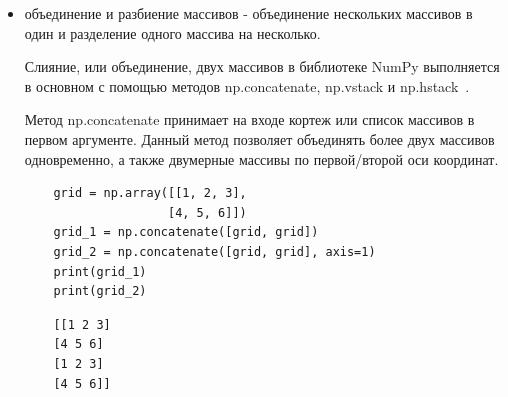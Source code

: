 \documentclass[pract]{SCWorks}
\begin{document}
\begin{itemize}
    [[1 2 3]

    [4 5 6]

    [7 8 9]]

    Операция изменения формы часто используется для преобразования одномерного массива в двумерную 
    матрицу-строку или матрицу-столбец.

        \begin{verbatim}
    x = np.array([1, 2, 3])
    # reshape возвращает новый объект, исходный x не меняется
    row = x.reshape((1, 3))   # вектор-строка
    col = x.reshape((3, 1))   # вектор-столбец
    print(row)
    print(col)
    \end{verbatim}
    В консоли:

    \begin{verbatim}
    [[1 2 3]]
    [[1]
     [2]
     [3]]
    \end{verbatim}

    Интересная "фишка" с коротким синтаксисом через метод \textbf{np.newaxis} с применением срезов для преобразования 
    одномерного массива в двумерную матрицу-строку или матрицу-столбец:

    \begin{verbatim}
    # преобразование в вектор-строку с помощью newaxis
    x[np.newaxis, :]
    # преобразование в вектор-столбец с помощью newaxis
    x[:, np.newaxis]
    \end{verbatim}
    \item объединение и разбиение массивов - объединение нескольких массивов в один и разделение одного массива на несколько.

    Слияние, или объединение, двух массивов в библиотеке NumPy выполняется в основном с помощью методов 
    np.concatenate, np.vstack и np.hstack~\cite{vanderplas}.

    Метод np.concatenate принимает на входе кортеж или список массивов в первом аргументе. Данный метод 
    позволяет объединять более двух массивов одновременно, а также двумерные массивы по первой/второй оси координат.

    \begin{verbatim}
    grid = np.array([[1, 2, 3],
                    [4, 5, 6]])
    grid_1 = np.concatenate([grid, grid])
    grid_2 = np.concatenate([grid, grid], axis=1)
    print(grid_1)
    print(grid_2)
    \end{verbatim}

    \begin{verbatim}
    [[1 2 3]
    [4 5 6]
    [1 2 3]
    [4 5 6]]


\end{verbatim}
\end{itemize}
\end{document}
